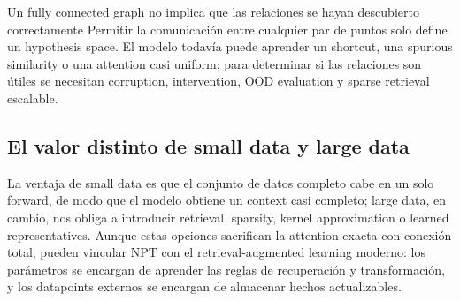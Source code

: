 \documentclass[a4paper]{article}
\begin{document}

\begin{warningbox}{Un fully connected graph no implica que las relaciones se hayan descubierto correctamente}
Permitir la comunicación entre cualquier par de puntos solo define un hypothesis space. El modelo todavía puede aprender un shortcut, una spurious similarity o una attention casi uniform; para determinar si las relaciones son útiles se necesitan corruption, intervention, OOD evaluation y sparse retrieval escalable.
\end{warningbox}

\subsection{El valor distinto de small data y large data}

La ventaja de small data es que el conjunto de datos completo cabe en un solo forward, de modo que el modelo obtiene un context casi completo; large data, en cambio, nos obliga a introducir retrieval, sparsity, kernel approximation o learned representatives. Aunque estas opciones sacrifican la attention exacta con conexión total, pueden vincular NPT con el retrieval-augmented learning moderno: los parámetros se encargan de aprender las reglas de recuperación y transformación, y los datapoints externos se encargan de almacenar hechos actualizables.

\end{document}
